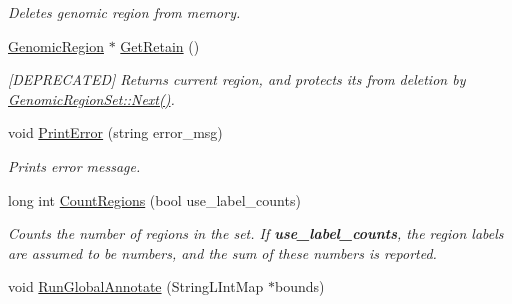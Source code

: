 \begin{CompactItemize}
\begin{CompactList}\small\item\em Deletes genomic region from memory. \item\end{CompactList}\item 
\hypertarget{classGenomicRegionSet_d7dfea15eb8968d376771d74e042f3a1}{
\hyperlink{classGenomicRegion}{GenomicRegion} $\ast$ \hyperlink{classGenomicRegionSet_d7dfea15eb8968d376771d74e042f3a1}{GetRetain} ()}
\label{classGenomicRegionSet_d7dfea15eb8968d376771d74e042f3a1}

\begin{CompactList}\small\item\em \mbox{[}DEPRECATED\mbox{]} Returns current region, and protects its from deletion by \hyperlink{classGenomicRegionSet_4f7501a27d13cae65247686182b78d51}{GenomicRegionSet::Next()}. \item\end{CompactList}\item 
\hypertarget{classGenomicRegionSet_39c746333affb32acffbf0f31b7f6fcf}{
void \hyperlink{classGenomicRegionSet_39c746333affb32acffbf0f31b7f6fcf}{PrintError} (string error\_\-msg)}
\label{classGenomicRegionSet_39c746333affb32acffbf0f31b7f6fcf}

\begin{CompactList}\small\item\em Prints error message. \item\end{CompactList}\item 
\hypertarget{classGenomicRegionSet_260acb32612d31325099c9e53366c9d2}{
long int \hyperlink{classGenomicRegionSet_260acb32612d31325099c9e53366c9d2}{CountRegions} (bool use\_\-label\_\-counts)}
\label{classGenomicRegionSet_260acb32612d31325099c9e53366c9d2}

\begin{CompactList}\small\item\em Counts the number of regions in the set. If {\bf use\_\-label\_\-counts}, the region labels are assumed to be numbers, and the sum of these numbers is reported. \item\end{CompactList}\item 
\hypertarget{classGenomicRegionSet_78c6f4879ac131e6db2094f21b466a98}{
void \hyperlink{classGenomicRegionSet_78c6f4879ac131e6db2094f21b466a98}{RunGlobalAnnotate} (StringLIntMap $\ast$bounds)}
\label{classGenomicRegionSet_78c6f4879ac131e6db2094f21b466a98}


\end{CompactItemize}
